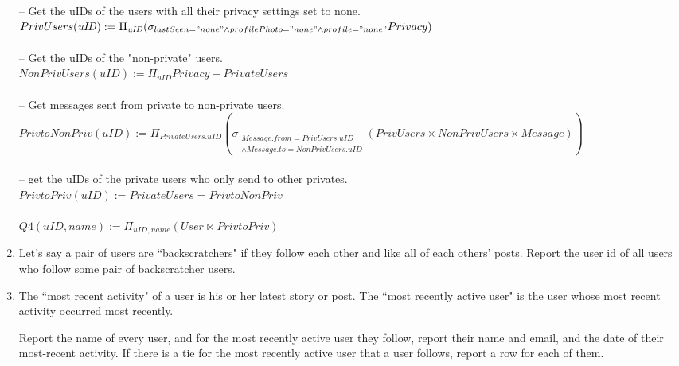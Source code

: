 \documentclass{article}
\newcommand{\var}[1]{\mathit{#1}}
\begin{document}
\begin{enumerate}
{\large
\hspace*{1cm} -- Get the uIDs of the users with all their privacy settings set to none. \\ [5pt]
$
PrivUsers(\var{uID}) := 
	\Pi_{\var{uID}}
	(\sigma_{lastSeen = "none" \\
			\wedge profilePhoto = "none" \\
			\wedge profile = "none"} Privacy)
$ \\\\
\hspace*{1cm} -- Get the uIDs of the "non-private" users. \\ [5pt]
$
NonPrivUsers(\var{uID}) :=
	\Pi_{\var{uID}} Privacy - PrivateUsers
$ \\\\
\hspace*{1cm} -- Get messages sent from private to non-private users.	 \\ [5pt]
$
PrivtoNonPriv(\var{uID}) :=
	\Pi_{\var{PrivateUsers.uID}}
	(\sigma_{\substack{Message.from = PrivUsers.uID \\
		 \wedge Message.to = NonPrivUsers.uID}}
		(PrivUsers \times NonPrivUsers \times Message))	
$ \\	\\
\hspace*{1cm} -- get the uIDs of the private users who only send to other privates. \\ [5pt]
$
PrivtoPriv(\var{uID}) :=
	PrivateUsers = PrivtoNonPriv
$ \\\\
$
Q4(\var{uID}, name) :=
	\Pi_{\var{uID}, \var{name}} (User \bowtie PrivtoPriv)
$


}

\item   %
Let's say a pair of users are ``backscratchers" 
if they follow each other and like all of each others' posts. 
Report the user id of all users who follow some pair of backscratcher users.

\item   %
The ``most recent activity" of a user is his or her latest story or post. 
The ``most recently active user" is the user whose most recent activity
occurred most recently.

Report the name of every user,
and for the most recently active user they follow,
report their name and email, and the date of their most-recent activity.
If there is a tie for the most recently active user that a user follows,
report a row for each of them.


\end{enumerate}
\end{document}
